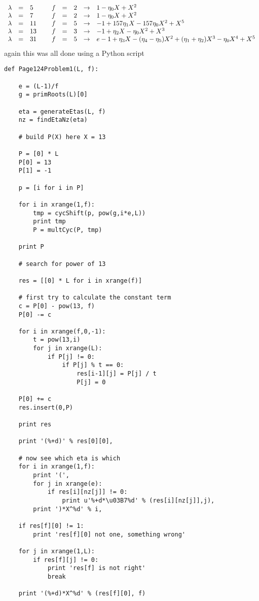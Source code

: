 \documentclass[aps,preprint,preprintnumbers,nofootinbib,showpacs,prd]{revtex4-1}
\newcommand{\nbea}{\begin{eqnarray*}}
\newcommand{\neea}{\end{eqnarray*}}
\begin{document}
%
\nbea
\begin{array}{r c l c r c l c l}
\lambda & = & 5 &~& f & = & 2 & \to & 1 - \eta_0 X  + X^2 \\
\lambda & = & 7 &~& f & = & 2 & \to & 1 - \eta_0 X  + X^2 \\
\lambda & = & 11 &~& f & = & 5 & \to & - 1 + 157 \eta_1 X  - 157 \eta_0 X^2  + X^5 \\
\lambda & = & 13 &~& f & = & 3 & \to & -1 + \eta_2 X -\eta_0 X^2 + X^3 \\
\lambda & = & 31 &~& f & = & 5 & \to & e -1 + \eta_3 X - (\eta_4 -\eta_5)X^2  + (\eta_1 + \eta_2 )X^3  - \eta_0 X^4 + X^5
\end{array}
\neea
%
again this was all done using a Python script
%
\begin{Verbatim}[baselinestretch=0.75]
def Page124Problem1(L, f):

    e = (L-1)/f
    g = primRoots(L)[0]

    eta = generateEtas(L, f)
    nz = findEtaNz(eta)

    # build P(X) here X = 13

    P = [0] * L
    P[0] = 13
    P[1] = -1

    p = [i for i in P]

    for i in xrange(1,f):
        tmp = cycShift(p, pow(g,i*e,L))
        print tmp
        P = multCyc(P, tmp)

    print P

    # search for power of 13

    res = [[0] * L for i in xrange(f)]

    # first try to calculate the constant term
    c = P[0] - pow(13, f)
    P[0] -= c
    
    for i in xrange(f,0,-1):
        t = pow(13,i)
        for j in xrange(L):
            if P[j] != 0:
                if P[j] % t == 0:
                    res[i-1][j] = P[j] / t
                    P[j] = 0

    P[0] += c
    res.insert(0,P)

    print res

    print '(%+d)' % res[0][0],
    
    # now see which eta is which
    for i in xrange(1,f):
        print '(',
        for j in xrange(e):
            if res[i][nz[j]] != 0:
                print u'%+d*\u03B7%d' % (res[i][nz[j]],j),
        print ')*X^%d' % i,

    if res[f][0] != 1:
        print 'res[f][0] not one, something wrong'
        
    for j in xrange(1,L):
        if res[f][j] != 0:
            print 'res[f] is not right'
            break
        
    print '(%+d)*X^%d' % (res[f][0], f)
\end{Verbatim}
%
\end{document}
